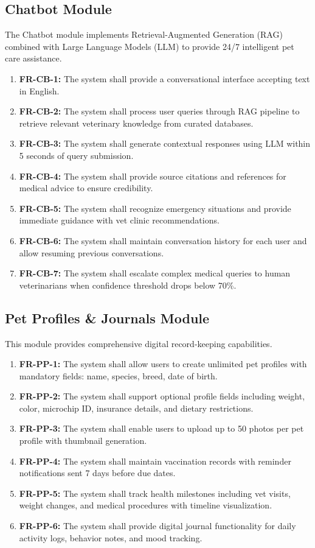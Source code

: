 \subsection{Chatbot Module}
The Chatbot module implements Retrieval-Augmented Generation (RAG) combined with Large Language Models (LLM) to provide 24/7 intelligent pet care assistance.

\begin{enumerate}
    \item \textbf{FR-CB-1:} The system shall provide a conversational interface accepting text in English.
    \item \textbf{FR-CB-2:} The system shall process user queries through RAG pipeline to retrieve relevant veterinary knowledge from curated databases.
    \item \textbf{FR-CB-3:} The system shall generate contextual responses using LLM within 5 seconds of query submission.
    \item \textbf{FR-CB-4:} The system shall provide source citations and references for medical advice to ensure credibility.
    \item \textbf{FR-CB-5:} The system shall recognize emergency situations and provide immediate guidance with vet clinic recommendations.
    \item \textbf{FR-CB-6:} The system shall maintain conversation history for each user and allow resuming previous conversations.
    \item \textbf{FR-CB-7:} The system shall escalate complex medical queries to human veterinarians when confidence threshold drops below 70\%.
\end{enumerate}

\subsection{Pet Profiles \& Journals Module}
This module provides comprehensive digital record-keeping capabilities.

\begin{enumerate}
    \item \textbf{FR-PP-1:} The system shall allow users to create unlimited pet profiles with mandatory fields: name, species, breed, date of birth.
    \item \textbf{FR-PP-2:} The system shall support optional profile fields including weight, color, microchip ID, insurance details, and dietary restrictions.
    \item \textbf{FR-PP-3:} The system shall enable users to upload up to 50 photos per pet profile with thumbnail generation.
    \item \textbf{FR-PP-4:} The system shall maintain vaccination records with reminder notifications sent 7 days before due dates.
    \item \textbf{FR-PP-5:} The system shall track health milestones including vet visits, weight changes, and medical procedures with timeline visualization.
    \item \textbf{FR-PP-6:} The system shall provide digital journal functionality for daily activity logs, behavior notes, and mood tracking.
   
\end{enumerate}

